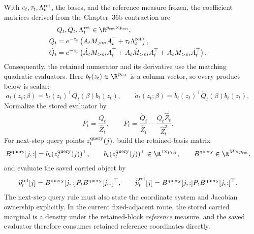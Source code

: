 With \(c_t,\tau_t,\Lambda_t^{\rm ret}\), the bases, and the reference measure
frozen, the coefficient matrices derived from the Chapter~36b contraction are
\begin{equation}
\begin{aligned}
  &Q_t,\dot Q_t,\Lambda_t^{\rm ret}
  \in\R^{p_{\rm ret}\times p_{\rm ret}},\\
  Q_t
  &=
  e^{-c_t}\left(
  A_tM_{>m}A_t^\top+\tau_t\Lambda_t^{\rm ret}\right),\\
  \dot Q_t
  &=
  e^{-c_t}\left(
  \dot A_tM_{>m}A_t^\top+
  A_t\dot M_{>m}A_t^\top+
  A_tM_{>m}\dot A_t^\top\right).
\end{aligned}
  \label{eq:bf-hd-ttkr-retained-Q-construction}
\end{equation}
Consequently, the retained numerator and its derivative use the matching
quadratic evaluators.  Here \(b_t(z_t)\in\R^{p_{\rm ret}}\) is a column vector,
so every product below is scalar:
\begin{equation}
  a_t(z_t;\beta)=b_t(z_t)^\top Q_t(\beta)b_t(z_t),
  \qquad
  \dot a_t(z_t;\beta)=b_t(z_t)^\top\dot Q_t(\beta)b_t(z_t),
  \label{eq:bf-hd-ttkr-retained-Q}
\end{equation}
Normalize the stored evaluator by
\begin{equation}
  P_t=\frac{Q_t}{\widehat Z_t},
  \qquad
  \dot P_t=
  \frac{\dot Q_t}{\widehat Z_t}
  -
  \frac{Q_t\dot{\widehat Z}_t}{\widehat Z_t^2}.
  \label{eq:bf-hd-ttkr-retained-P}
\end{equation}
For next-step query points $z_t^{\rm query}(j)$, build the retained-basis matrix
\begin{equation}
  B^{\rm query}[j,:]=b_t(z_t^{\rm query}(j))^\top,
  \qquad
  b_t(z_t^{\rm query}(j))^\top\in\R^{1\times p_{\rm ret}},
  \qquad B^{\rm query}\in\R^{M\times p_{\rm ret}},
  \label{eq:bf-hd-ttkr-retained-query-basis}
\end{equation}
and evaluate the saved carried object by
\begin{equation}
  \widehat p_t^{\rm ref}[j]
  =
  B^{\rm query}[j,:]P_tB^{\rm query}[j,:]^\top,
  \qquad
  \dot{\widehat p}_t^{\rm ref}[j]
  =
  B^{\rm query}[j,:]\dot P_tB^{\rm query}[j,:]^\top.
  \label{eq:bf-hd-ttkr-retained-query-rule}
\end{equation}
The next-step query rule must also state the coordinate system and Jacobian
ownership explicitly.  In the current fixed-adjacent route, the stored carried
marginal is a density under the retained-block \emph{reference} measure, and the
saved evaluator therefore consumes retained reference coordinates directly.
